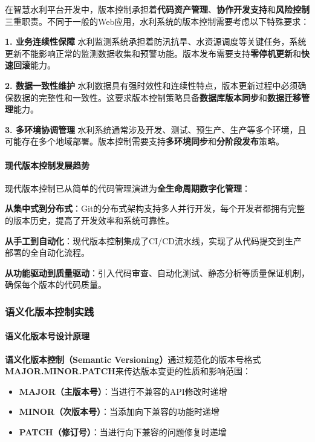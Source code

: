 在智慧水利平台开发中，版本控制承担着\textbf{代码资产管理}、\textbf{协作开发支持}和\textbf{风险控制}三重职责。不同于一般的Web应用，水利系统的版本控制需要考虑以下特殊要求：

\textbf{1. 业务连续性保障} 水利监测系统承担着防汛抗旱、水资源调度等关键任务，系统更新不能影响正常的监测数据收集和预警功能。版本发布需要支持\textbf{零停机更新}和\textbf{快速回滚}能力。

\textbf{2. 数据一致性维护} 水利数据具有强时效性和连续性特点，版本更新过程中必须确保数据的完整性和一致性。这要求版本控制策略具备\textbf{数据库版本同步}和\textbf{数据迁移管理}能力。

\textbf{3. 多环境协调管理} 水利系统通常涉及开发、测试、预生产、生产等多个环境，且可能存在多个地域部署。版本控制需要支持\textbf{多环境同步}和\textbf{分阶段发布}策略。

\paragraph{现代版本控制发展趋势}\label{ux73b0ux4ee3ux7248ux672cux63a7ux5236ux53d1ux5c55ux8d8bux52bf}

现代版本控制已从简单的代码管理演进为\textbf{全生命周期数字化管理}：

\textbf{从集中式到分布式}：Git的分布式架构支持多人并行开发，每个开发者都拥有完整的版本历史，提高了开发效率和系统可靠性。

\textbf{从手工到自动化}：现代版本控制集成了CI/CD流水线，实现了从代码提交到生产部署的全自动化流程。

\textbf{从功能驱动到质量驱动}：引入代码审查、自动化测试、静态分析等质量保证机制，确保每个版本的代码质量。

\subsubsection{语义化版本控制实践}\label{ux8bedux4e49ux5316ux7248ux672cux63a7ux5236ux5b9eux8df5}

\paragraph{语义化版本号设计原理}\label{ux8bedux4e49ux5316ux7248ux672cux53f7ux8bbeux8ba1ux539fux7406}

\textbf{语义化版本控制（Semantic Versioning）}通过规范化的版本号格式\textbf{MAJOR.MINOR.PATCH}来传达版本变更的性质和影响范围：

\begin{itemize}
\tightlist
\item
  \textbf{MAJOR（主版本号）}：当进行不兼容的API修改时递增
\item
  \textbf{MINOR（次版本号）}：当添加向下兼容的功能时递增\\
\item
  \textbf{PATCH（修订号）}：当进行向下兼容的问题修复时递增
\end{itemize}

